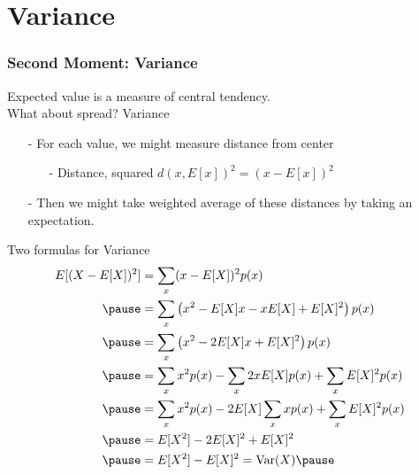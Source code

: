 \documentclass[aspectratio=169, handout]{beamer}
\numberwithin{equation}{section}
\begin{document}
\section{Variance}

\begin{frame}
\frametitle{Second Moment: Variance} 

Expected value is a measure of \alert{central tendency}. \pause \\
What about spread? \pause  \alert{Variance}  \pause \\
\begin{itemize}
\item[-] For each value, we might measure distance from center \pause 
\begin{itemize}
\item[-] Distance, squared $d(x, E[x])^{2} = (x - E[x])^2$  \pause 
\end{itemize}
\item[-] Then we might take weighted average of these distances by taking an expectation. \pause 
\end{itemize}

\end{frame}

\begin{frame}{Two formulas for Variance}
\begin{align*} 
E[(X - E[X])^2] &= \sum_{x} (x  - E[X])^2p(x) \\  \pause 
& =  \sum_{x} \left(x^2  -E[X] x -x E[X] + E[X]^2\right) p(x)   \\  \pause 
& =  \sum_{x} \left(x^2  -2E[X] x  + E[X]^2\right) p(x)  \\  \pause 
& =  \sum_{x} x^2 p(x)   - \sum_{x} 2x E[X]p(x) + \sum_{x} E[X]^2 p(x)   \\  \pause 
& =  \sum_{x} x^2 p(x)   - 2E[X] \sum_{x} x p(x) + \sum_{x} E[X]^2 p(x)   \\  \pause 
& =  E[X^2] - 2E[X]^2 + E[X]^2  \\ \pause 
& =  E[X^2] - E[X]^2 =  \text{Var}(X) \pause 
\end{align*}
\end{frame}
\end{document}

